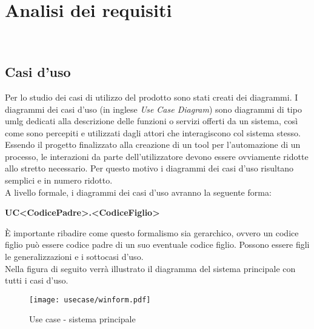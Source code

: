 
\chapter{Analisi dei requisiti}
\label{cap:analisi-requisiti}

\noindent {}\\

\section{Casi d'uso}

\noindent Per lo studio dei casi di utilizzo del prodotto sono stati creati dei diagrammi.
I diagrammi dei casi d'uso (in inglese \emph{Use Case Diagram}) sono diagrammi di tipo \gls{umlg} dedicati alla descrizione delle funzioni o servizi offerti da un sistema, così come sono percepiti e utilizzati dagli attori che interagiscono col sistema stesso.
Essendo il progetto finalizzato alla creazione di un tool per l'automazione di un processo, le interazioni da parte dell'utilizzatore devono essere ovviamente ridotte allo stretto necessario. Per questo motivo i diagrammi dei casi d'uso risultano semplici e in numero ridotto.\\

\noindent A livello formale, i diagrammi dei casi d'uso avranno la seguente forma:
\begin{center}
    \textbf{UC<CodicePadre>.<CodiceFiglio>}
\end{center}
\noindent È importante ribadire come questo formalismo sia gerarchico, ovvero un codice figlio
può essere codice padre di un suo eventuale codice figlio. Possono essere figli le generalizzazioni e i sottocasi d'uso.\\

\noindent Nella figura di seguito verrà illustrato il diagramma del sistema principale con tutti i casi d'uso.
\vspace*{\fill}
\begin{figure}[!h] 
   \centering 
   \texttt{[image: usecase/winform.pdf]} 
   \caption{Use case - sistema principale}
\end{figure}
\vspace*{\fill}

